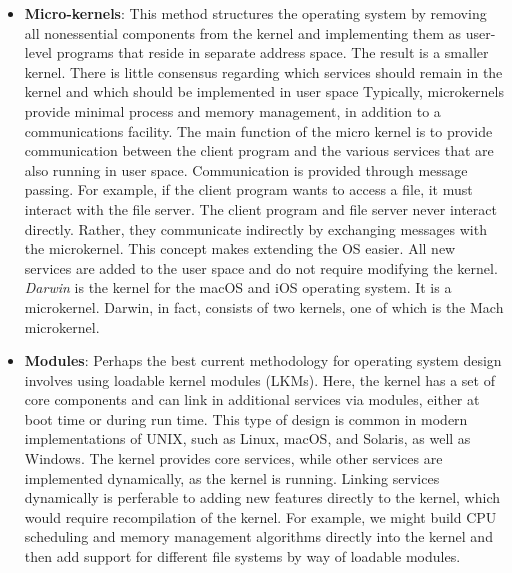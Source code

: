 \documentclass{report}
\begin{document}
\begin{itemize}
            \bigbreak \noindent 
            Main advantage of the layered approach is simplicity of construction and debugging. The layers are selected so that each uses functions and services of only lower-level layers. If an error is found on a layer, the error must be on that layer. Because the layers below are already debugged.
            \bigbreak \noindent 
            Layered systems have been successfully used in computer networks (such as TPC/IP) and web applications. But few operating systems use a pure layered approach.
            \bigbreak \noindent 
            High overhead and hard to define functionality of each layer.
        \item \textbf{Micro-kernels}: This method structures the operating system by removing all nonessential components from the kernel and implementing them as user-level programs that reside in separate address space. The result is a smaller kernel. There is little consensus regarding which services should remain in the kernel and which should be implemented in user space
            \bigbreak \noindent 
            Typically, microkernels provide minimal process and memory management, in addition to a communications facility. The main function of the micro kernel is to provide communication between the client program and the various services that are also running in user space. Communication is provided through message passing.
            \bigbreak \noindent 
            For example, if the client program wants to access a file, it must interact with the file server. The client program and file server never interact directly. Rather, they communicate indirectly by exchanging messages with the microkernel.
            \bigbreak \noindent 
            This concept makes extending the OS easier. All new services are added to the user space and do not require modifying the kernel.
            \bigbreak \noindent 
            \textit{Darwin} is the kernel for the macOS and iOS operating system. It is a microkernel. Darwin, in fact, consists of two kernels, one of which is the Mach microkernel.
        \item \textbf{Modules}: Perhaps the best current methodology for operating system design involves using loadable kernel modules (LKMs). Here, the kernel has a set of core components and can link in additional services via modules, either at boot time or during run time. This type of design is common in modern implementations of UNIX, such as Linux, macOS, and Solaris, as well as Windows.
            \bigbreak \noindent 
            The kernel provides core services, while other services are implemented dynamically, as the kernel is running. Linking services dynamically is perferable to adding new features directly to the kernel, which would require recompilation of the kernel. For example, we might build CPU scheduling and memory management algorithms directly into the kernel and then add support for different file systems by way of loadable modules.

\end{itemize}
\end{document}
